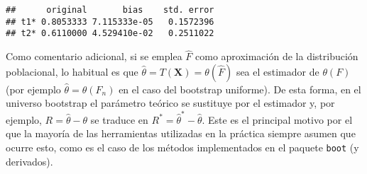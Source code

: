 \documentclass[
]{book}
\newenvironment{Shaded}{\begin{snugshade}}{\end{snugshade}}
\newcommand{\AttributeTok}[1]{\textcolor[rgb]{0.77,0.63,0.00}{#1}}
\newcommand{\ConstantTok}[1]{\textcolor[rgb]{0.00,0.00,0.00}{#1}}
\newcommand{\DecValTok}[1]{\textcolor[rgb]{0.00,0.00,0.81}{#1}}
\newcommand{\FunctionTok}[1]{\textcolor[rgb]{0.00,0.00,0.00}{#1}}
\newcommand{\NormalTok}[1]{#1}
\newcommand{\OtherTok}[1]{\textcolor[rgb]{0.56,0.35,0.01}{#1}}
\newcommand{\SpecialCharTok}[1]{\textcolor[rgb]{0.00,0.00,0.00}{#1}}
\newcommand{\StringTok}[1]{\textcolor[rgb]{0.31,0.60,0.02}{#1}}
\theoremstyle{break}
\theoremstyle{definition}
\theoremstyle{definition}
\theoremstyle{definition}
\theoremstyle{definition}
\theoremstyle{remark}
\begin{document}
\begin{Shaded}
\end{Shaded}

\begin{verbatim}
##      original       bias    std. error
## t1* 0.8053333 7.115333e-05   0.1572396
## t2* 0.6110000 4.529410e-02   0.2511022
\end{verbatim}

Como comentario adicional, si se emplea \(\hat F\) como aproximación de la distribución poblacional, lo habitual es que \(\hat\theta = T\left( \mathbf{X} \right) = \theta ( \hat{F} )\) sea el estimador de \(\theta(F)\) (por ejemplo \(\hat\theta = \theta(F_n)\) en el caso del bootstrap uniforme).
De esta forma, en el universo bootstrap el parámetro teórico se sustituye por el estimador y, por ejemplo, \(R = \hat \theta - \theta\) se traduce en \(R^{\ast} = \hat{\theta}^{\ast}- \hat \theta\).
Este es el principal motivo por el que la mayoría de las herramientas utilizadas en la práctica siempre asumen que ocurre esto, como es el caso de los métodos implementados en el paquete \texttt{boot} (y derivados).
\end{document}
